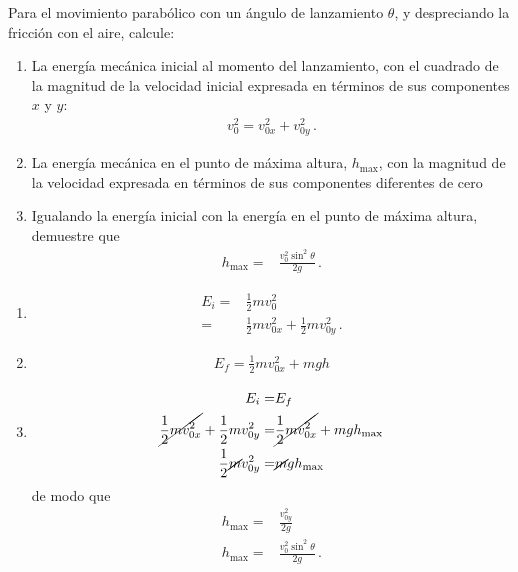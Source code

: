 \documentclass[12pt, a4paper]{article}
\begin{document}
\begin{exercise}[ID=hmax, tags={banco}]
Para el movimiento parabólico con un ángulo de lanzamiento $\theta$, y despreciando la fricción con el aire, calcule:
\begin{enumerate}
    \item La energía mecánica inicial al momento del lanzamiento, con el cuadrado de la magnitud de la velocidad inicial expresada en términos de sus componentes $x$ y $y$:
    \begin{align*}
        v_0^2 = v_{0x}^2+ v_{0y}^2\,.
    \end{align*}
    \item La energía mecánica en el punto de máxima altura, $h_{\text{max}}$, con la magnitud de la velocidad expresada en términos de sus componentes diferentes de cero
    \item Igualando la energía inicial con la energía  en el punto de máxima altura, demuestre que
    \begin{align*}
        h_{\text{max}}=&\frac{v_{0}^2\sin^2\theta}{2g}\,.
    \end{align*}
\end{enumerate}
\end{exercise}
\begin{solution}
\begin{enumerate}
    \item 
    \begin{align}
    E_i=&\frac{1}{2}m v_0^2\nonumber\\
    =&\frac{1}{2}mv_{0x}^2+ \frac{1}{2}mv_{0y}^2\,.
    \end{align}
    \item 
    \begin{align}
        E_f = \frac{1}{2}m v_{0x}^2+mgh
    \end{align}
    \item 
    \begin{align}
        E_i=& E_f\nonumber\\
   \cancel{ \frac{1}{2}mv_{0x}^2}+ \frac{1}{2}mv_{0y}^2 =& \cancel{\frac{1}{2}m v_{0x}^2}+mgh_{\text{max}}\nonumber\\
    \frac{1}{2}\cancel{m}v_{0y}^2 =& \cancel{m}g h_{\text{max}}\nonumber\\
    \end{align}
    de modo que
    \begin{align}
        h_{\text{max}} =& \frac{v_{0y}^2}{2g}\nonumber\\
        h_{\text{max}}=&\frac{v_{0}^2\sin^2\theta}{2g}\,.
    \end{align}
    
\end{enumerate}
\end{solution}
\end{document}
